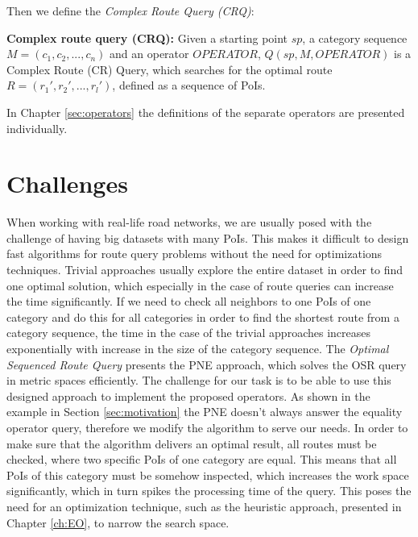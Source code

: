 Then we define the \textit{Complex Route Query (CRQ)}:

\textbf{Complex route query (CRQ):} Given a starting point $sp$, a category sequence $M = (c_1, c_2, ..., c_n)$ and an operator $OPERATOR$, $Q(sp, M, OPERATOR)$ is a Complex Route (CR) Query, which searches for the optimal route $R = (r_1', r_2', ..., r_l')$, defined as a sequence of PoIs.

In Chapter \ref{sec:operators} the definitions of the separate operators are presented individually.

\section{Challenges}
When working with real-life road networks, we are usually posed with the challenge of having big datasets with many PoIs. This makes it difficult to design fast algorithms for route query problems without the need for optimizations techniques. Trivial approaches usually explore the entire dataset in order to find one optimal solution, which especially in the case of route queries can increase the time significantly. If we need to check all neighbors to one PoIs of one category and do this for all categories in order to find the shortest route from a category sequence, the time in the case of the trivial approaches increases exponentially with increase in the size of the category sequence. The \textit{Optimal Sequenced Route Query} \cite{OSR} presents the PNE approach, which solves the OSR query in metric spaces efficiently. The challenge for our task is to be able to use this designed approach to implement the proposed operators. \newline
As shown in the example in Section \ref{sec:motivation} the PNE doesn't always answer the equality operator query, therefore we modify the algorithm to serve our needs. In order to make sure that the algorithm delivers an optimal result, all routes must be checked, where two specific PoIs of one category are equal. This means that all PoIs of this category must be somehow inspected, which increases the work space significantly, which in turn spikes the processing time of the query. This poses the need for an optimization technique, such as the heuristic approach, presented in Chapter \ref{ch:EO}, to narrow the search space. \newline
